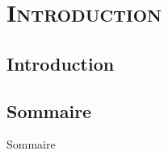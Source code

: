 \section{\scshape Introduction}
\subsection*{Introduction}
\begin{frame}
\titlepage
\end{frame}

\subsection*{Sommaire}
\begin{frame}{Sommaire}
	\setlength{\columnsep}{2cm}
	\setlength{\columnseprule}{1pt}
	\begin{multicols}{2}
		\tableofcontents
	\end{multicols}
\end{frame}